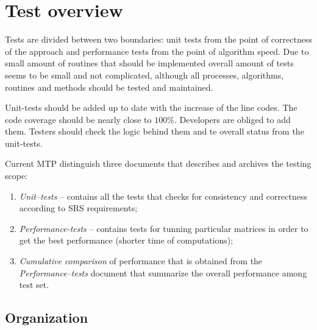 \section{Test overview} \label{s:introduction:test-overview}
	\begin{comment}
		$<$Describe the test organization, test schedule, integrity level scheme, test resources, responsibilities, tools, techniques, and methods necessary to perform the testing. $>$
	\end{comment}
	
	Tests are divided between two boundaries: unit tests from the point of correctness of the approach and performance tests from the point of algorithm speed. Due to small amount of routines that should be implemented overall amount of tests seems to be small and not complicated, although all processes, algorithms, routines and methods should be tested and maintained.
	
	Unit-tests should be added up to date with the increase of the line codes. The code coverage should be nearly close to $100\%$. Developers are obliged to add them. Testers should check the logic behind them and te overall status from the unit-tests.
	
	Current \gls{MTP} distinguish three documents that describes and archives the testing scope:
	\begin{enumerate}
		\item \emph{Unit--tests} -- contains all the tests that checks for consistency and correctness according to \gls{SRS} requirements;
		\item \emph{Performance-tests} -- contains tests for tunning particular matrices in order to get the best performance (shorter time of computations);
		\item \emph{Cumulative comparison} of performance that is obtained from the \emph{Performance--tests} document that summarize the overall performance among test set. 
	\end{enumerate}
\subsection{Organization} \label{s:introduction:organization}
	\begin{comment}
		$<$Describe the relationship of the test processes to other processes such as development, project
		management, quality assurance, and configuration management. Include the lines of communication
		within the testing organization(s), the authority for resolving issues raised by the testing tasks, and the authority for approving test products and processes. This may include (but should not be limited to) a visual representation, e.g., an organization chart. $>$
	\end{comment}

